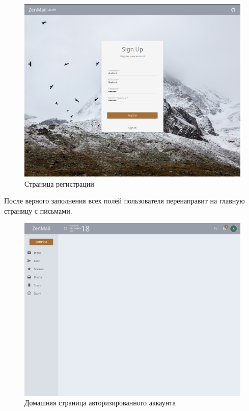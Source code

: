 \documentclass{article}
\begin{document}
\begin{figure}[H]
        \begin{flushleft}
            \centerline{\includegraphics[scale=0.6]{register.png}}
            \caption{Страница регистрации}
        \end{flushleft}
\end{figure}

После верного заполнения всех полей пользователя перенаправит на главную страницу с письмами.
\begin{figure}[H]
        \begin{flushleft}
            \centerline{\includegraphics[scale=0.6]{homescreen.png}}
            \caption{Домашняя страница авторизированного аккаунта}
        \end{flushleft}
\end{figure}
\end{document}
